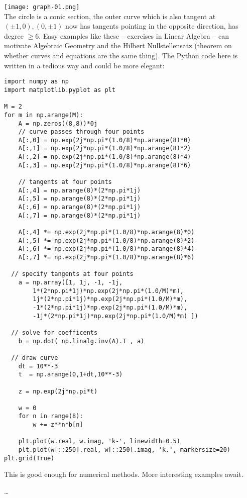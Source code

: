 \documentclass[12pt]{article}
\begin{document}
\texttt{[image: graph-01.png]} \\
The circle is a conic section, the outer curve which is also tangent at $(\pm 1,0), (0, \pm 1)$ now has tangents pointing in the opposite direction, has degree $\geq 6$.  Easy examples like these -- exercises in Linear Algebra -- can motivate Algebraic Geometry and the Hilbert Nullstellensatz (theorem on whether curves and equations are the same thing). The Python code here is written in a tedious way and could be more elegant:
\begin{verbatim}
import numpy as np
import matplotlib.pyplot as plt

M = 2
for m in np.arange(M):
    A = np.zeros((8,8))*0j
	// curve passes through four points
    A[:,0] = np.exp(2j*np.pi*(1.0/8)*np.arange(8)*0)
    A[:,1] = np.exp(2j*np.pi*(1.0/8)*np.arange(8)*2)
    A[:,2] = np.exp(2j*np.pi*(1.0/8)*np.arange(8)*4)
    A[:,3] = np.exp(2j*np.pi*(1.0/8)*np.arange(8)*6)

	// tangents at four points
    A[:,4] = np.arange(8)*(2*np.pi*1j)
    A[:,5] = np.arange(8)*(2*np.pi*1j)
    A[:,6] = np.arange(8)*(2*np.pi*1j)
    A[:,7] = np.arange(8)*(2*np.pi*1j)

    A[:,4] *= np.exp(2j*np.pi*(1.0/8)*np.arange(8)*0)
    A[:,5] *= np.exp(2j*np.pi*(1.0/8)*np.arange(8)*2)
    A[:,6] *= np.exp(2j*np.pi*(1.0/8)*np.arange(8)*4)
    A[:,7] *= np.exp(2j*np.pi*(1.0/8)*np.arange(8)*6)

  // specify tangents at four points
    a = np.array([1, 1j, -1, -1j, 
    	1*(2*np.pi*1j)*np.exp(2j*np.pi*(1.0/M)*m), 
    	1j*(2*np.pi*1j)*np.exp(2j*np.pi*(1.0/M)*m), 
    	-1*(2*np.pi*1j)*np.exp(2j*np.pi*(1.0/M)*m), 
    	-1j*(2*np.pi*1j)*np.exp(2j*np.pi*(1.0/M)*m) ])

  // solve for coefficents
    b = np.dot( np.linalg.inv(A).T , a)

  // draw curve
    dt = 10**-3
    t  = np.arange(0,1+dt,10**-3)

    z = np.exp(2j*np.pi*t)

    w = 0
    for n in range(8):
        w += z**n*b[n]

    plt.plot(w.real, w.imag, 'k-', linewidth=0.5)
    plt.plot(w[::250].real, w[::250].imag, 'k.', markersize=20)
plt.grid(True)

\end{verbatim}

\noindent This is good enough for numerical methods.  More interesting examples await.

\vfill



\begin{thebibliography}{}

\item \dots 

\end{thebibliography}
\end{document}
